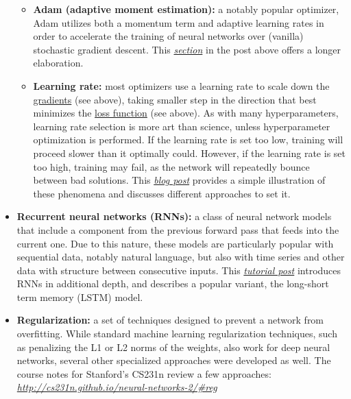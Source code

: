 \begin{itemize}
    \begin{itemize} 
    \item \textbf{Adam (adaptive moment estimation):\label{tg:adam}} a notably popular optimizer, Adam utilizes both a momentum term and adaptive learning rates in order to accelerate the training of neural networks over (vanilla) stochastic gradient descent. This \href{http://ruder.io/optimizing-gradient-descent/index.html\#adam}{\emph{section}} in the post above offers a longer elaboration.
    \item \textbf{Learning rate:} most optimizers use a learning rate to scale down the \hyperref[tg:gradient]{gradients} (see above), taking smaller step in the direction that best minimizes the \hyperref[tg:loss]{loss function} (see above). As with many hyperparameters, learning rate selection is more art than science, unless hyperparameter optimization is performed. If the learning rate is set too low, training will proceed slower than it optimally could. However, if the learning rate is set too high, training may fail, as the network will repeatedly bounce between bad solutions. This \href{https://www.jeremyjordan.me/nn-learning-rate/}{\emph{blog post}} provides a simple illustration of these phenomena and discusses different approaches to set it.
    \end{itemize}
 
\item \textbf{Recurrent neural networks (RNNs):\label{tg:rnn}} a class of neural network models that include a component from the previous forward pass that feeds into the current one. Due to this nature, these models are particularly popular with sequential data, notably natural language, but also with time series and other data with structure between consecutive inputs. This \href{https://skymind.ai/wiki/lstm}{\emph{tutorial post}} introduces RNNs in additional depth, and describes a popular variant, the long-short term memory (LSTM) model.

\item \textbf{Regularization:\label{tg:regularization}} a set of techniques designed to prevent a network from overfitting. While standard machine learning regularization techniques, such as penalizing the L1 or L2 norms of the weights, also work for deep neural networks, several other specialized approaches were developed as well. The course notes for Stanford's CS231n review a few approaches: \href{http://cs231n.github.io/neural-networks-2/\#reg}{\emph{http://cs231n.github.io/neural-networks-2/\#reg}}


\end{itemize}
